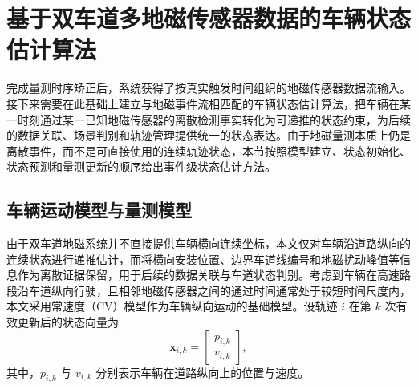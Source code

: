 \documentclass{xdupgthesis}
\begin{document}
\section{基于双车道多地磁传感器数据的车辆状态估计算法}
\label{sec:ch3_state_estimation}

完成量测时序矫正后，系统获得了按真实触发时间组织的地磁传感器数据流输入。接下来需要在此基础上建立与地磁事件流相匹配的车辆状态估计算法，把车辆在某一时刻通过某一已知地磁传感器的离散检测事实转化为可递推的状态约束，为后续的数据关联、场景判别和轨迹管理提供统一的状态表达。由于地磁量测本质上仍是离散事件，而不是可直接使用的连续轨迹状态，本节按照模型建立、状态初始化、状态预测和量测更新的顺序给出事件级状态估计方法。



\subsection{车辆运动模型与量测模型}

由于双车道地磁系统并不直接提供车辆横向连续坐标，本文仅对车辆沿道路纵向的连续状态进行递推估计，而将横向安装位置、边界车道线编号和地磁扰动峰值等信息作为离散证据保留，用于后续的数据关联与车道状态判别。考虑到车辆在高速路段沿车道纵向行驶，且相邻地磁传感器之间的通过时间通常处于较短时间尺度内，本文采用常速度（CV）模型作为车辆纵向运动的基础模型。设轨迹 $i$ 在第 $k$ 次有效更新后的状态向量为
\begin{equation}
	\mathbf x_{i,k}=
	\begin{bmatrix}
		p_{i,k}\\
		v_{i,k}
	\end{bmatrix},
	\label{eq:ch3_state_vec}
\end{equation}
其中，$p_{i,k}$ 与 $v_{i,k}$ 分别表示车辆在道路纵向上的位置与速度。
\end{document}
